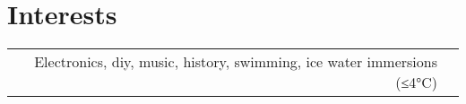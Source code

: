 %
%
%



\section{\texorpdfstring{\color{Blue}Interests}{Interests}}
\begin{tabular}{rl}
    Electronics, diy, music, history, swimming, ice water immersions (≤4°C)\\
\end{tabular}
